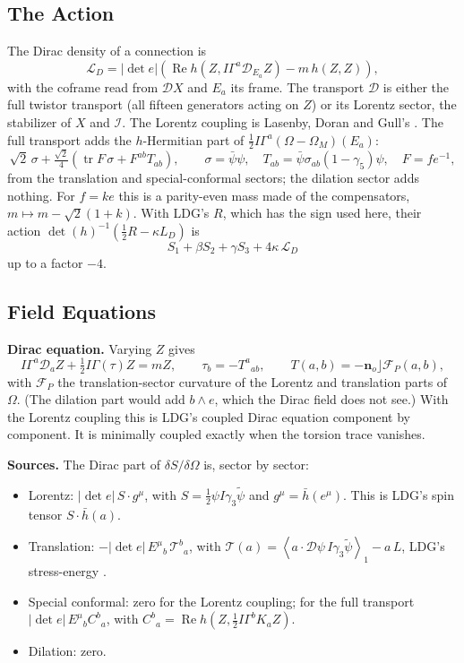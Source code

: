 \documentclass[11pt,a4paper]{article}
\newcommand{\D}{\mathcal{D}}
\newcommand{\F}{\mathcal{F}}
\newcommand{\Om}{\Omega}
\newcommand{\nzero}{\mathbf{n}_o}
\newcommand{\rev}[1]{\widetilde{#1}}
\newcommand{\grade}[2]{\left\langle #1\right\rangle_{#2}}
\begin{document}
\subsection{The Action}

The Dirac density of a connection is
\[
    \boxed{
        \mathcal L_D=|\det e|\left(
        \operatorname{Re}h\left(Z,I\Gamma^a\D_{E_a}Z\right)-m\,h(Z,Z)
        \right),
    }
\]
with the coframe read from \(\D X\) and \(E_a\) its frame. The
transport \(\D\) is either the full twistor transport (all fifteen
generators acting on \(Z\)) or its Lorentz sector, the stabilizer of
\(X\) and \(\mathcal I\). The Lorentz coupling is Lasenby, Doran and
Gull's \cite[(3.56)]{LDG}. The full transport adds the \(h\)-Hermitian
part of \(\tfrac12I\Gamma^a(\Om-\Om_M)(E_a)\):
\[
    \sqrt2\,\sigma
    +\tfrac{\sqrt2}4\left(\operatorname{tr}F\,\sigma+F^{ab}T_{ab}\right),
    \qquad
    \sigma=\bar\psi\psi,
    \quad
    T_{ab}=\bar\psi\sigma_{ab}(1-\gamma_5)\psi,
    \quad
    F=fe^{-1},
\]
from the translation and special-conformal sectors; the dilation
sector adds nothing. For \(f=ke\) this is a parity-even mass made of
the compensators, \(m\mapsto m-\sqrt2(1+k)\). With LDG's \(R\), which
has the sign used here, their action
\(\det(h)^{-1}(\tfrac12R-\kappa L_D)\) is
\[
    \boxed{
        S_1+\beta S_2+\gamma S_3+4\kappa\,\mathcal L_D
    }
\]
up to a factor \(-4\).

\subsection{Field Equations}

\textbf{Dirac equation.} Varying \(Z\) gives
\[
    I\Gamma^a\D_aZ+\tfrac12I\Gamma(\tau)Z=mZ,
    \qquad
    \tau_b=-T^a{}_{ab},
    \qquad
    T(a,b)=-\nzero\rfloor\F_P(a,b),
\]
with \(\F_P\) the translation-sector curvature of the Lorentz and
translation parts of \(\Om\). (The dilation part would add \(b\wedge e\),
which the Dirac field does not see.) With the Lorentz coupling this is
LDG's coupled Dirac equation \cite[(3.62)]{LDG} component by
component. It is minimally coupled exactly when the torsion trace
vanishes.

\textbf{Sources.} The Dirac part of \(\delta S/\delta\Om\) is, sector by
sector:
\begin{itemize}
    \item Lorentz: \(|\det e|\,S\cdot g^\mu\), with
    \(S=\tfrac12\psi I\gamma_3\rev\psi\) and \(g^\mu=\bar h(e^\mu)\). This
    is LDG's spin tensor \(S\cdot\bar h(a)\).
    \item Translation: \(-|\det e|\,E^\mu{}_b\,\mathcal T^b{}_a\), with
    \(\mathcal T(a)=\grade{a\cdot\D\psi\,I\gamma_3\rev\psi}{1}-a\,L\), LDG's
    stress-energy \cite[(4.20)]{LDG}.
    \item Special conformal: zero for the Lorentz coupling; for the full
    transport \(|\det e|\,E^\mu{}_bC^b{}_a\), with
    \(C^b{}_a=\operatorname{Re}h(Z,\tfrac12I\Gamma^bK_aZ)\).
    \item Dilation: zero.
\end{itemize}
\end{document}
